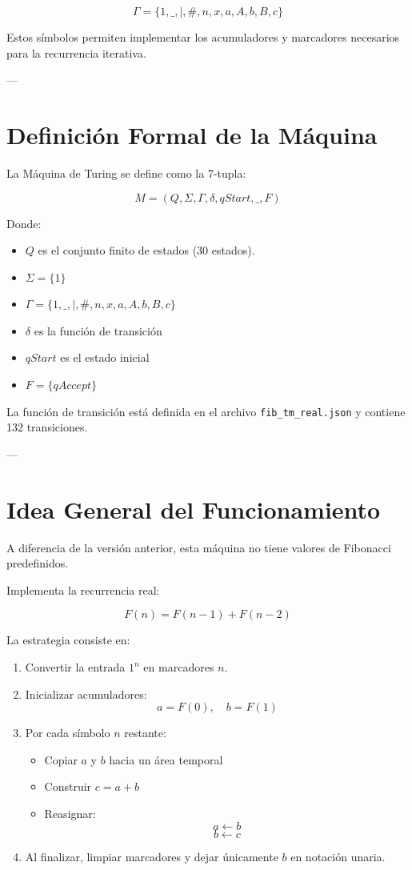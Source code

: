 \documentclass[12pt]{article}
\begin{document}
\[
\Gamma = \{1,\_, |, \#, n, x, a, A, b, B, c\}
\]

Estos símbolos permiten implementar los acumuladores y marcadores necesarios para la recurrencia iterativa.

---

\section{Definición Formal de la Máquina}

La Máquina de Turing se define como la 7-tupla:

\[
M = (Q, \Sigma, \Gamma, \delta, qStart, \_, F)
\]

Donde:

\begin{itemize}
\item $Q$ es el conjunto finito de estados (30 estados).
\item $\Sigma = \{1\}$
\item $\Gamma = \{1,\_, |, \#, n, x, a, A, b, B, c\}$
\item $\delta$ es la función de transición
\item $qStart$ es el estado inicial
\item $F = \{qAccept\}$
\end{itemize}

La función de transición está definida en el archivo \texttt{fib\_tm\_real.json} y contiene 132 transiciones.

---

\section{Idea General del Funcionamiento}

A diferencia de la versión anterior, esta máquina no tiene valores de Fibonacci predefinidos.

Implementa la recurrencia real:

\[
F(n) = F(n-1) + F(n-2)
\]

La estrategia consiste en:

\begin{enumerate}
\item Convertir la entrada $1^n$ en marcadores $n$.
\item Inicializar acumuladores:
\[
a = F(0), \quad b = F(1)
\]
\item Por cada símbolo $n$ restante:
\begin{itemize}
\item Copiar $a$ y $b$ hacia un área temporal
\item Construir $c = a + b$
\item Reasignar:
\[
a \leftarrow b
\]
\[
b \leftarrow c
\]
\end{itemize}
\item Al finalizar, limpiar marcadores y dejar únicamente $b$ en notación unaria.
\end{enumerate}
\end{document}
